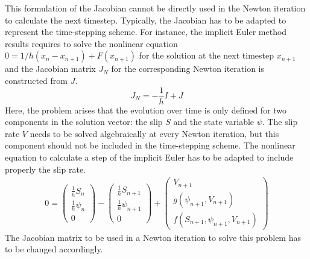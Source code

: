This formulation of the Jacobian cannot be directly used in the Newton iteration to calculate the next timestep. Typically, the Jacobian has to be adapted to represent the time-stepping scheme. For instance, the implicit Euler method results requires to solve the nonlinear equation $0 = 1/h(x_n - x_{n+1}) + F(x_{n+1})$ for the solution at the next timestep $x_{n+1}$ and the Jacobian matrix $J_N$ for the corresponding Newton iteration is constructed from $J$. 
\begin{equation}
	J_N = -\frac{1}{h}I + J
\end{equation}
Here, the problem arises that the evolution over time is only defined for two components in the solution vector: the slip $S$ and the state variable $\psi$. The slip rate $V$ needs to be solved algebraically at every Newton iteration, but this component should not be included in the time-stepping scheme. The nonlinear equation to calculate a step of the implicit Euler has to be adapted to include properly the slip rate. 
\begin{align}
	0 = \begin{pmatrix} \frac{1}{h}S_n     \\ \frac{1}{h}\psi_n     \\ 0 \end{pmatrix} - 
		\begin{pmatrix} \frac{1}{h}S_{n+1} \\ \frac{1}{h}\psi_{n+1} \\ 0 \end{pmatrix} + 
		\begin{pmatrix} V_{n+1}            \\ g(\psi_{n+1},V_{n+1}) \\ f(S_{n+1}, \psi_{n+1}, V_{n+1}) \end{pmatrix}
\end{align}
The Jacobian matrix to be used in a Newton iteration to solve this problem has to be changed accordingly.
